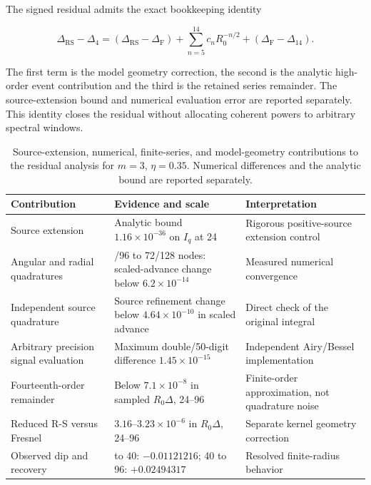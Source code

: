 The signed residual admits the exact bookkeeping identity

\begin{equation}\Delta_{\mathrm{RS}}-\Delta_4=(\Delta_{\mathrm{RS}}-\Delta_{\mathrm F})+\sum_{n=5}^{14}c_nR_0^{-n/2}+(\Delta_{\mathrm F}-\Delta_{14}).\end{equation}

The first term is the model geometry correction, the second is the
analytic high-order event contribution and the third is the retained
series remainder. The source-extension bound and numerical evaluation
error are reported separately. This identity closes the residual without
allocating coherent powers to arbitrary spectral windows.

\begin{longtable}[]{@{}
  >{\raggedright\arraybackslash}p{}
  >{\raggedright\arraybackslash}p{}
  >{\raggedright\arraybackslash}p{}@{}}
\caption{Source-extension, numerical, finite-series, and model-geometry contributions to the residual analysis for $m=3$, $\eta=0.35$. Numerical differences and the analytic bound are reported separately.}\label{tab:residual-error-accounting}\\
\toprule\noalign{}
\begin{minipage}[b]{\linewidth}\raggedright
Contribution
\end{minipage} & \begin{minipage}[b]{\linewidth}\raggedright
Evidence and scale
\end{minipage} & \begin{minipage}[b]{\linewidth}\raggedright
Interpretation
\end{minipage} \\
\midrule\noalign{}
\endhead
\bottomrule\noalign{}
\endlastfoot
Source extension & Analytic bound \(1.16\times10^{-36}\) on \(I_q\) at
24 & Rigorous positive-source extension control \\
Angular and radial quadratures & 48/96 to 72/128 nodes: scaled-advance
change below \(6.2\times10^{-14}\) & Measured numerical convergence \\
Independent source quadrature & Source refinement change below
\(4.64\times10^{-10}\) in scaled advance & Direct check of the original
integral \\
Arbitrary precision signal evaluation & Maximum double/50-digit
difference \(1.45\times10^{-15}\) & Independent Airy/Bessel
implementation \\
Fourteenth-order remainder & Below \(7.1\times10^{-8}\) in sampled
\(R_0\Delta\), 24--96 & Finite-order approximation, not quadrature
noise \\
Reduced R-S versus Fresnel & \(3.16\)--\(3.23\times10^{-6}\) in
\(R_0\Delta\), 24--96 & Separate kernel geometry correction \\
Observed dip and recovery & 24 to 40: \(-0.01121216\); 40 to 96:
\(+0.02494317\) & Resolved finite-radius behavior \\
\end{longtable}

